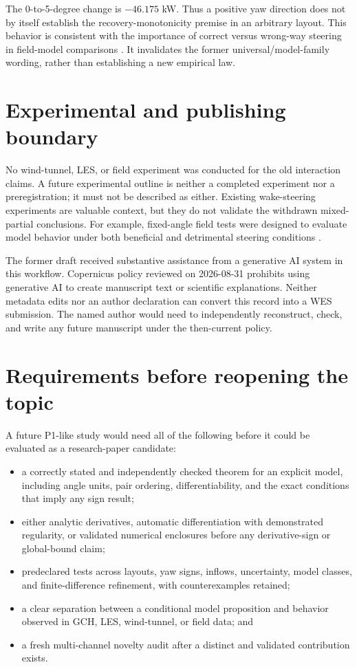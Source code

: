 \documentclass[wes, manuscript]{copernicus}
\begin{document}
The 0-to-5-degree change is $-46.175$ kW. Thus a positive yaw direction does not by itself establish the recovery-monotonicity premise in an arbitrary layout. This behavior is consistent with the importance of correct versus wrong-way steering in field-model comparisons \citep{fleming2021fixedangles}. It invalidates the former universal/model-family wording, rather than establishing a new empirical law.

\section{Experimental and publishing boundary}
\label{sec:boundary}

No wind-tunnel, LES, or field experiment was conducted for the old interaction claims. A future experimental outline is neither a completed experiment nor a preregistration; it must not be described as either. Existing wake-steering experiments are valuable context, but they do not validate the withdrawn mixed-partial conclusions. For example, fixed-angle field tests were designed to evaluate model behavior under both beneficial and detrimental steering conditions \citep{fleming2021fixedangles}.

The former draft received substantive assistance from a generative AI system in this workflow. Copernicus policy reviewed on 2026-08-31 prohibits using generative AI to create manuscript text or scientific explanations. Neither metadata edits nor an author declaration can convert this record into a WES submission. The named author would need to independently reconstruct, check, and write any future manuscript under the then-current policy.

\section{Requirements before reopening the topic}
\label{sec:requirements}

A future P1-like study would need all of the following before it could be evaluated as a research-paper candidate:
\begin{itemize}
\item a correctly stated and independently checked theorem for an explicit model, including angle units, pair ordering, differentiability, and the exact conditions that imply any sign result;
\item either analytic derivatives, automatic differentiation with demonstrated regularity, or validated numerical enclosures before any derivative-sign or global-bound claim;
\item predeclared tests across layouts, yaw signs, inflows, uncertainty, model classes, and finite-difference refinement, with counterexamples retained;
\item a clear separation between a conditional model proposition and behavior observed in GCH, LES, wind-tunnel, or field data; and
\item a fresh multi-channel novelty audit after a distinct and validated contribution exists.
\end{itemize}
\end{document}
